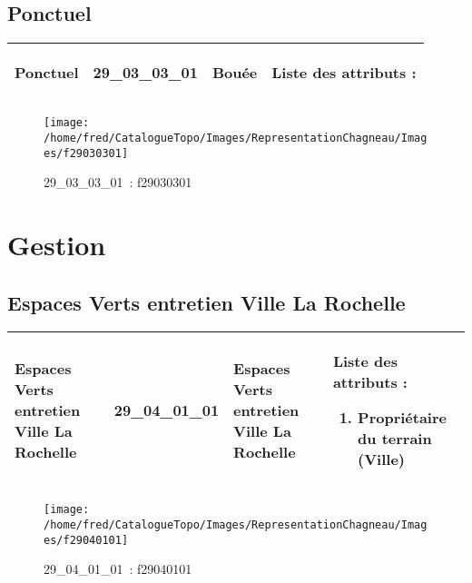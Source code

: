 \documentclass[12pt,titlepage]{book}
\begin{document}
\subsection{Ponctuel}
\noindent
\vspace{\baselineskip}

\renewcommand{\arraystretch}{1.2}
\begin{supertabular}{|p{10cm}|c|p{13cm}|p{12cm}|}
 Ponctuel & 29\_03\_03\_01 & Bouée & Liste des attributs :
\begin{enumerate}
\end{enumerate}
\\
\hline
\end{supertabular}
\begin{figure}[h!]
  \hfill         %
  \begin{minipage}[t]{3cm}
    \begin{center}
      \texttt{[image: /home/fred/CatalogueTopo/Images/RepresentationChagneau/Images/f29030301]}
      \caption[~29\_03\_03\_01]{\small{29\_03\_03\_01~:} \tiny{f29030301}}\label{f29030301}
    \end{center}
  \end{minipage}
\end{figure}

\section{\large Gestion}
\subsection{Espaces Verts entretien Ville La Rochelle}
\noindent
\vspace{\baselineskip}

\renewcommand{\arraystretch}{1.2}
\begin{supertabular}{|p{10cm}|c|p{13cm}|p{12cm}|}
 Espaces Verts entretien Ville La Rochelle & 29\_04\_01\_01 & Espaces Verts entretien Ville La Rochelle & Liste des attributs :
\begin{enumerate}
  \item Propriétaire du terrain (Ville)\end{enumerate}
\\
\hline
\end{supertabular}
\begin{figure}[h!]
  \hfill         %
  \begin{minipage}[t]{3cm}
    \begin{center}
      \texttt{[image: /home/fred/CatalogueTopo/Images/RepresentationChagneau/Images/f29040101]}
      \caption[~29\_04\_01\_01]{\small{29\_04\_01\_01~:} \tiny{f29040101}}\label{f29040101}
    \end{center}
  \end{minipage}
\end{figure}
\end{document}
